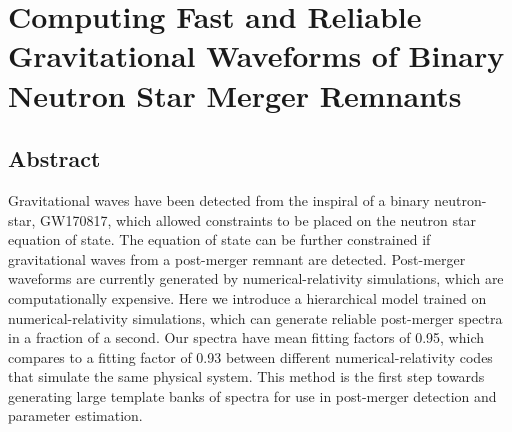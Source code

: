 \documentclass[../Thesis.tex]{subfiles}
\begin{document}
\begingroup
\clearpage%
\let\clearpage\relax%
\vspace*{-2cm}%



\chapter{Computing Fast and Reliable Gravitational Waveforms of Binary Neutron Star Merger Remnants}
\label{chapter:ComputingFastReliable}
\endgroup 






\section*{Abstract}
	Gravitational waves have been detected from the inspiral of a binary neutron-star, GW170817, which allowed constraints to be placed on the neutron star equation of state. The equation of state can be further constrained if gravitational waves from a post-merger remnant are detected. Post-merger waveforms are currently generated by numerical-relativity simulations, which are computationally expensive. Here we introduce a hierarchical model trained on numerical-relativity simulations, which can generate reliable post-merger spectra in a fraction of a second. Our spectra have mean fitting factors of 0.95, which compares to a fitting factor of 0.93 between different numerical-relativity codes that simulate the same physical system. This method is the first step towards generating large template banks of spectra for use in post-merger detection and parameter estimation.
\end{document}
